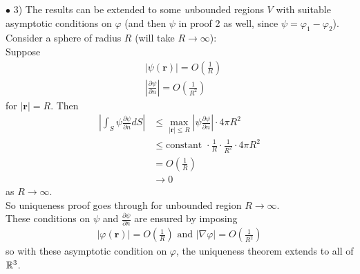 \documentclass[a4paper]{article}
\begin{document}
\begin{rem}
$\bullet$ 3) The results can be extended to some \emph{un}bounded regions $V$ with suitable asymptotic conditions on $\varphi$ (and then $\psi$ in proof 2 as well, since $\psi = \varphi_1 - \varphi_2$).\\
Consider a sphere of radius $R$ (will take $R\to\infty$):\\
Suppose 
\begin{equation*}
\begin{aligned}
&|\psi\left(\mathbf{r}\right)| = O\left(\frac{1}{R}\right)\\
&|\frac{\partial \psi}{\partial n}| = O\left(\frac{1}{R^2}\right)
\end{aligned}
\end{equation*}
for $|\mathbf{r}| = R$. Then
\begin{equation*}
\begin{aligned}
|\int_S \psi\frac{\partial \psi}{\partial n} dS| &\leq \max_{|\mathbf{r}|\leq R} | \psi \frac{\partial \psi}{\partial n}|\cdot 4\pi R^2\\
&\leq \text{constant   }\cdot \frac{1}{R}\cdot\frac{1}{R^2}\cdot 4\pi R^2\\
&=O\left(\frac{1}{R}\right)\\
&\to 0
\end{aligned}
\end{equation*}
as $R\to\infty$.\\
So uniqueness proof goes through for unbounded region $R\to\infty$.\\
These conditions on $\psi$ and $\frac{\partial \psi}{\partial n}$ are ensured by imposing
\begin{equation*}
\begin{aligned}
|\varphi\left(\mathbf{r}\right)| = O\left(\frac{1}{R}\right) \text{   and   } |\nabla \varphi| = O\left(\frac{1}{R^2}\right)
\end{aligned}
\end{equation*}
so with these asymptotic condition on $\varphi$, the uniqueness theorem extends to all of $\mathbb{R}^3$.\\


\end{rem}
\end{document}
